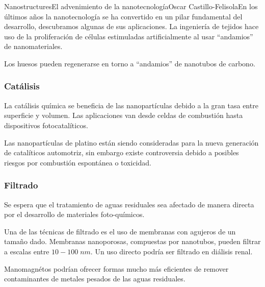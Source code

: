 \begin{article}{Nanostructures}{El advenimiento de la nanotecnolog\'ia}{Oscar Castillo-Felisola}{En los \'ultimos a\~nos la nanotecnolog\'ia se ha convertido en un pilar fundamental del desarrollo, descubramos algunas de sus aplicaciones.}
La ingenier\'ia de tejidos hace uso de la proliferaci\'on de c\'elulas estimuladas artificialmente al usar ``andamios'' de nanomateriales.

Los huesos pueden regenerarse en torno a ``andamios'' de nanotubos de carbono.




\subsubsection*{Cat\'alisis}

La cat\'alisis qu\'imica se beneficia de las nanopart\'iculas debido a la gran tasa entre superficie y volumen. Las aplicaciones van desde celdas de combusti\'on hasta dispositivos fotocatal\'iticos.

Las nanopart\'iculas de platino est\'an siendo consideradas para la nueva generaci\'on de catal\'iticos automotriz, sin embargo existe controversia debido a posibles riesgos por combusti\'on espont\'anea o toxicidad.

\subsubsection*{Filtrado}

Se espera que el tratamiento de aguas residuales sea afectado de manera directa por el desarrollo de materiales foto-qu\'imicos.


Una de las t\'ecnicas de filtrado es el uso de membranas con agujeros de un tama\~no dado.  Membranas nanoporosas, compuestas por nanotubos, pueden filtrar a escalas entre $10-100\;nm$. Un uso directo podr\'ia ser filtrado en di\'alisis renal.

Manomagn\'etos podr\'ian ofrecer formas mucho m\'as eficientes de remover contaminantes de metales pesados de las aguas residuales.






\end{article}
